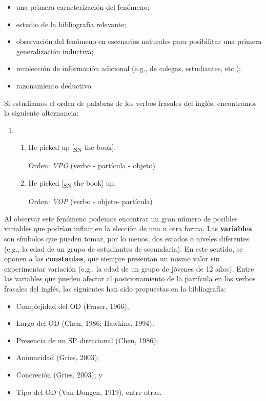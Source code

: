 \documentclass[12pt,spanish,a4paper,]{article}
\providecommand{\tightlist}{%
  \setlength{\itemsep}{0pt}\setlength{\parskip}{0pt}}
\begin{document}
\begin{itemize}
\tightlist
\item
  una primera caracterización del fenómeno;
\item
  estudio de la bibliografía relevante;
\item
  observación del fenómeno en escenarios naturales para posibilitar una
  primera generalización inductiva;
\item
  recolección de información adicional (e.g., de colegas, estudiantes,
  etc.);
\item
  razonamiento deductivo.
\end{itemize}

Si estudiamos el orden de palabras de los verbos frasales del inglés,
encontramos la siguiente alternancia:

\begin{enumerate}
\def\labelenumi{(\arabic{enumi})}
\item
  \begin{enumerate}
  \def\labelenumii{\alph{enumii}.}
  \item
    He picked up {[}\textsubscript{SN} the book{]}.

    Orden: \emph{VPO} (verbo - partícula - objeto)
  \item
    He picked {[}\textsubscript{SN} the book{]} up.

    Orden: \emph{VOP} (verbo - objeto- partícula)
  \end{enumerate}
\end{enumerate}

Al observar este fenómeno podemos encontrar un gran número de posibles
variables que podrían influir en la elección de una u otra forma. Las
\textbf{variables} son símbolos que pueden tomar, por lo menos, dos
estados o niveles diferentes (e.g., la edad de un grupo de estudiantes
de secundaria). En este sentido, se oponen a las \textbf{constantes},
que siempre presentan un mismo valor sin experimentar variación (e.g.,
la edad de un grupo de jóvenes de 12 años). Entre las variables que
pueden afectar al posicionamiento de la partícula en los verbos frasales
del inglés, las siguientes han sido propuestas en la bibliografía:

\begin{itemize}
\tightlist
\item
  Complejidad del OD (Fraser, 1966);
\item
  Largo del OD (Chen, 1986; Hawkins, 1994);
\item
  Presencia de un SP direccional (Chen, 1986);
\item
  Animacidad (Gries, 2003);
\item
  Concreción (Gries, 2003); y
\item
  Tipo del OD (Van Dongen, 1919), entre otras.
\end{itemize}
\end{document}
